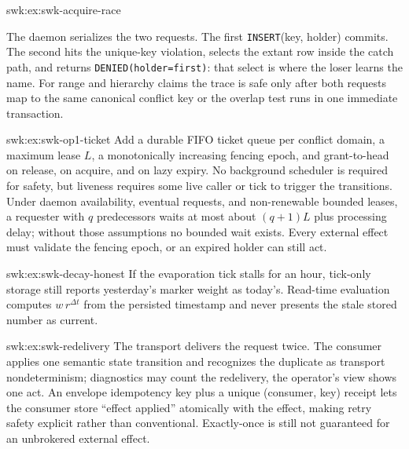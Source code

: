 \begin{pdSolution}{swk:ex:swk-acquire-race}
\begin{center}
\end{center}
\par\smallskip
The daemon serializes the two requests. The first \texttt{INSERT}\allowbreak(key, holder) commits. The second hits the unique-key violation, selects the extant row inside the catch path, and returns \texttt{DENIED}\allowbreak\texttt{(holder}\allowbreak\texttt{=first)}: that select is where the loser learns the name. For range and hierarchy claims the trace is safe only after both requests map to the same canonical conflict key or the overlap test runs in one immediate transaction.
\end{pdSolution}
\begin{pdSolution}{swk:ex:swk-op1-ticket}
Add a durable FIFO ticket queue per conflict domain, a maximum lease $L$, a monotonically increasing fencing epoch, and grant-to-head on release, on acquire, and on lazy expiry. No background scheduler is required for safety, but liveness requires some live caller or tick to trigger the transitions. Under daemon availability, eventual requests, and non-renewable bounded leases, a requester with $q$ predecessors waits at most about $(q+1)L$ plus processing delay; without those assumptions no bounded wait exists. Every external effect must validate the fencing epoch, or an expired holder can still act.
\end{pdSolution}
\begin{pdSolution}{swk:ex:swk-decay-honest}
If the evaporation tick stalls for an hour, tick-only storage still reports yesterday's marker weight as today's. Read-time evaluation computes $w\,r^{\Delta t}$ from the persisted timestamp and never presents the stale stored number as current.
\end{pdSolution}
\begin{pdSolution}{swk:ex:swk-redelivery}
The transport delivers the request twice. The consumer applies one semantic state transition and recognizes the duplicate as transport nondeterminism; diagnostics may count the redelivery, the operator's view shows one act. An envelope idempotency key plus a unique (consumer, key) receipt lets the consumer store ``effect applied'' atomically with the effect, making retry safety explicit rather than conventional. Exactly-once is still not guaranteed for an unbrokered external effect.
\end{pdSolution}
